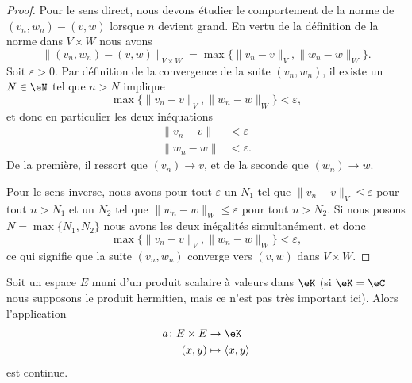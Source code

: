 \begin{proof}
	Pour le sens direct, nous devons étudier le comportement de la norme de $(v_n,w_n)-(v,w)$ lorsque $n$ devient grand. En vertu de la définition de la norme dans $V\times W$ nous avons
	\begin{equation}
		\Big\| (v_n,w_n)-(v,w) \Big\|_{V\times W}=\max\big\{ \| v_n-v \|_V,\| w_n-w \|_W \big\}.
	\end{equation}
	Soit $\varepsilon>0$. Par définition de la convergence de la suite $(v_n,w_n)$, il existe un $N\in\eN$ tel que $n>N$ implique
	\begin{equation}
		\max\big\{ \| v_n-v \|_V,\| w_n-w \|_W \big\}<\varepsilon,
	\end{equation}
	et donc en particulier les deux inéquations
	\begin{subequations}
		\begin{align}
			\| v_n-v \|&<\varepsilon\\
			\| w_n-w \|&<\varepsilon.
		\end{align}
	\end{subequations}
	De la première, il ressort que $(v_n)\to v$, et de la seconde que $(w_n)\to w$.

	Pour le sens inverse, nous avons pour tout $\varepsilon$ un $N_1$ tel que $\| v_n-v \|_V\leq\varepsilon$ pour tout $n>N_1$ et un $N_2$ tel que $\| w_n-w \|_W\leq\varepsilon$ pour tout $n>N_2$. Si nous posons $N=\max\{ N_1,N_2 \}$ nous avons les deux inégalités simultanément, et donc
	\begin{equation}
		\max\big\{ \| v_n-v \|_V,\| w_n-w \|_W \big\}<\varepsilon,
	\end{equation}
	ce qui signifie que la suite $(v_n,w_n)$ converge vers $(v,w)$ dans $V\times W$.
\end{proof}

\begin{proposition}          \label{PROPooKDGOooDjWQct}
    Soit un espace \( E\) muni d'un produit scalaire à valeurs dans \( \eK\) (si \( \eK=\eC\) nous supposons le produit hermitien, mais ce n'est pas très important ici). Alors l'application
    \begin{equation}
        \begin{aligned}
            a\colon E\times E&\to \eK \\
            (x,y)&\mapsto \langle x, y\rangle
        \end{aligned}
    \end{equation}
    est continue.
\end{proposition}

